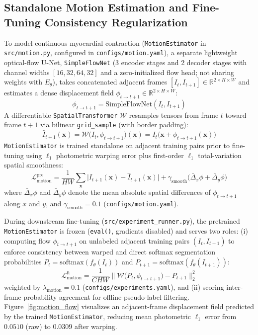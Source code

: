 \documentclass[pdflatex,sn-mathphys]{sn-jnl}
\theoremstyle{thmstyleone}
\theoremstyle{thmstyletwo}
\theoremstyle{thmstylethree}
\begin{document}
\subsection{Standalone Motion Estimation and Fine-Tuning Consistency Regularization}
To model continuous myocardial contraction (\texttt{MotionEstimator} in \texttt{src/motion.py}, configured in \texttt{configs/motion.yaml}), a separate lightweight optical-flow U-Net, \texttt{SimpleFlowNet} (3 encoder stages and 2 decoder stages with channel widths $[16, 32, 64, 32]$ and a zero-initialized flow head; not sharing weights with $E_\theta$), takes concatenated adjacent frames $[I_t, I_{t+1}] \in \mathbb{R}^{2 \times H \times W}$ and estimates a dense displacement field $\phi_{t \to t+1} \in \mathbb{R}^{2 \times H \times W}$:
\begin{equation}
\phi_{t \to t+1} = \text{SimpleFlowNet}(I_t, I_{t+1})
\label{eq:flownet}
\end{equation}
A differentiable \texttt{SpatialTransformer} $\mathcal{W}$ resamples tensors from frame $t$ toward frame $t+1$ via bilinear \texttt{grid\_sample} (with border padding):
\begin{equation}
\hat{I}_{t+1}(\mathbf{x}) = \mathcal{W}\bigl(I_t, \phi_{t \to t+1}\bigr)(\mathbf{x}) = I_t\bigl(\mathbf{x} + \phi_{t \to t+1}(\mathbf{x})\bigr)
\label{eq:warping}
\end{equation}
\texttt{MotionEstimator} is trained standalone on adjacent training pairs prior to fine-tuning using $\ell_1$ photometric warping error plus first-order $\ell_1$ total-variation spatial smoothness:
\begin{equation}
\mathcal{L}_{\text{motion}}^{\text{pre}} = \frac{1}{HW} \sum_{\mathbf{x}} \bigl| I_{t+1}(\mathbf{x}) - \hat{I}_{t+1}(\mathbf{x}) \bigr| + \gamma_{\text{smooth}} \bigl(\bar{\Delta}_x \phi + \bar{\Delta}_y \phi\bigr)
\label{eq:loss_motion}
\end{equation}
where $\bar{\Delta}_x \phi$ and $\bar{\Delta}_y \phi$ denote the mean absolute spatial differences of $\phi_{t \to t+1}$ along $x$ and $y$, and $\gamma_{\text{smooth}} = 0.1$ (\texttt{configs/motion.yaml}).

During downstream fine-tuning (\texttt{src/experiment\_runner.py}), the pretrained \texttt{MotionEstimator} is frozen (\texttt{eval()}, gradients disabled) and serves two roles: (i) computing flow $\phi_{t \to t+1}$ on unlabeled adjacent training pairs $(I_t, I_{t+1})$ to enforce consistency between warped and direct softmax segmentation probabilities $P_t = \text{softmax}(f_\theta(I_t))$ and $P_{t+1} = \text{softmax}(f_\theta(I_{t+1}))$:
\begin{equation}
\mathcal{L}_{\text{motion}}^{\text{ft}} = \frac{1}{C H W} \bigl\| \mathcal{W}\bigl(P_t, \phi_{t \to t+1}\bigr) - P_{t+1} \bigr\|_2^2
\label{eq:loss_motion_ft}
\end{equation}
weighted by $\lambda_{\text{motion}} = 0.1$ (\texttt{configs/experiments.yaml}), and (ii) scoring inter-frame probability agreement for offline pseudo-label filtering. Figure~\ref{fig:motion_flow} visualizes an adjacent-frame displacement field predicted by the trained \texttt{MotionEstimator}, reducing mean photometric $\ell_1$ error from $0.0510$ (raw) to $0.0309$ after warping.
\end{document}
